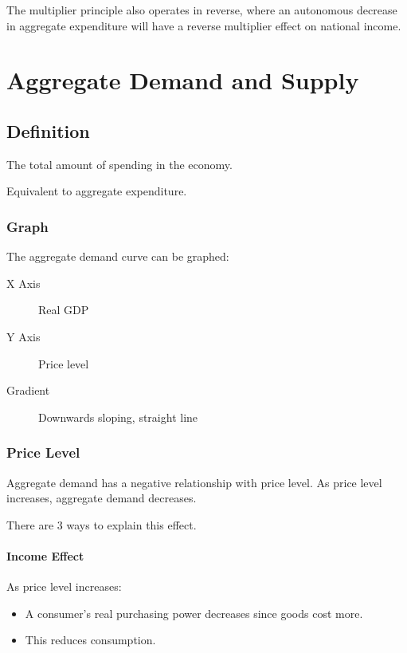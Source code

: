 \documentclass[a4paper,11pt]{report}
\begin{document}
The multiplier principle also operates in reverse, where an autonomous decrease
in aggregate expenditure will have a reverse multiplier effect on national
income.




\chapter{Aggregate Demand and Supply}

\section{Definition}

The total amount of spending in the economy.

Equivalent to aggregate expenditure.

\subsection{Graph}

The aggregate demand curve can be graphed:

\begin{description}
\item [X Axis] Real GDP
\item [Y Axis] Price level
\item [Gradient] Downwards sloping, straight line
\end{description}

\subsection{Price Level}

Aggregate demand has a negative relationship with price level. As price level
increases, aggregate demand decreases.

There are 3 ways to explain this effect.

\subsubsection{Income Effect}

As price level increases:

\begin{itemize}
\item A consumer's real purchasing power decreases since goods cost more.
\item This reduces consumption.
\end{itemize}
\end{document}
